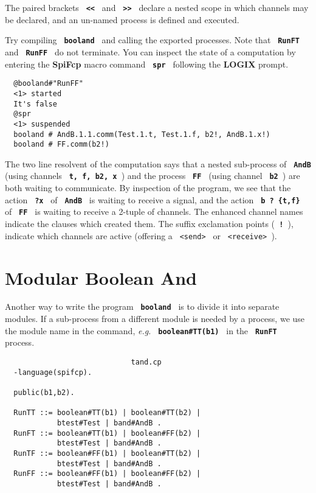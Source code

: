 \documentclass[twoside,10pt]{report}
\begin{document}
\noindent
The paired brackets {\bf \verb+ << +} and {\bf \verb+ >> +} declare
a nested scope in which channels may be declared, and an
un-named process is defined and executed.

\noindent
Try compiling {\bf \verb+ booland +} and calling the exported processes.
Note that {\bf \verb+ RunFT +}
\linebreak and {\bf \verb+ RunFF +} do not terminate.
\newline
You can inspect the state of a computation by entering the {\bf SpiFcp} macro
command {\bf \verb+ spr +} following the {\bf LOGIX} prompt.

\begin{verbatim}
  @booland#"RunFF"
  <1> started
  It's false
  @spr
  <1> suspended
  booland # AndB.1.1.comm(Test.1.t, Test.1.f, b2!, AndB.1.x!)
  booland # FF.comm(b2!)
\end{verbatim}

\noindent
The two line resolvent of the computation says that a nested sub-process of
{\bf \verb+ AndB +} (using channels {\bf \verb+ t, f, b2, x +}) and the process
{\bf \verb+ FF +} (using channel {\bf \verb+ b2 +}) are both waiting to
communicate.  By inspection of the program, we see that the action
{\bf \verb+ ?x +}
of {\bf \verb+ AndB +} is waiting to receive a signal, and the
action {\bf \verb+ b ? {t,f} +} of {\bf \verb+ FF +} is waiting to receive a
2-tuple of channels.  The enhanced channel names indicate the clauses
which created them.  The suffix exclamation points ({\bf \verb+ ! +}),
indicate which channels are active (offering a {\verb+ <send> +}
or {\verb+ <receive> +}).

\section{Modular Boolean And}
\label{mbooland}
Another way to write the program {\bf \verb+ booland +} is to divide it
into separate modules. If a sub-process from a different module is
needed by a process, we use the module name in the command, {\em e.g.}
{\bf \verb+ boolean#TT(b1) +} in the {\bf \verb+ RunFT +} process.

\begin{verbatim}
                             tand.cp
  -language(spifcp).

  public(b1,b2).

  RunTT ::= boolean#TT(b1) | boolean#TT(b2) |
            btest#Test | band#AndB .
  RunFT ::= boolean#TT(b1) | boolean#FF(b2) |
            btest#Test | band#AndB .
  RunTF ::= boolean#FF(b1) | boolean#TT(b2) |
            btest#Test | band#AndB .
  RunFF ::= boolean#FF(b1) | boolean#FF(b2) |
            btest#Test | band#AndB .
\end{verbatim}
\end{document}
